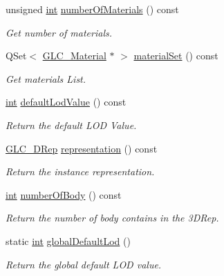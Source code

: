 \begin{DoxyCompactItemize}
unsigned \hyperlink{ioapi_8h_a787fa3cf048117ba7123753c1e74fcd6}{int} \hyperlink{class_g_l_c__3_d_view_instance_ad70b15e7174d9f15e6577bbeb6bd1ed4}{number\-Of\-Materials} () const 
\begin{DoxyCompactList}\small\item\em Get number of materials. \end{DoxyCompactList}\item 
Q\-Set$<$ \hyperlink{class_g_l_c___material}{G\-L\-C\-\_\-\-Material} $\ast$ $>$ \hyperlink{class_g_l_c__3_d_view_instance_a9480322486ef25200cd9da9bf24865ea}{material\-Set} () const 
\begin{DoxyCompactList}\small\item\em Get materials List. \end{DoxyCompactList}\item 
\hyperlink{ioapi_8h_a787fa3cf048117ba7123753c1e74fcd6}{int} \hyperlink{class_g_l_c__3_d_view_instance_a34a76e4f1930c6501b2999910e1cdad7}{default\-Lod\-Value} () const 
\begin{DoxyCompactList}\small\item\em Return the default L\-O\-D Value. \end{DoxyCompactList}\item 
\hyperlink{class_g_l_c__3_d_rep}{G\-L\-C\-\_\-D\-Rep} \hyperlink{class_g_l_c__3_d_view_instance_a1a09befa1df8bf493878feaa22e7a971}{representation} () const 
\begin{DoxyCompactList}\small\item\em Return the instance representation. \end{DoxyCompactList}\item 
\hyperlink{ioapi_8h_a787fa3cf048117ba7123753c1e74fcd6}{int} \hyperlink{class_g_l_c__3_d_view_instance_ad8e2ec4021082d2f83d9631f5b3bd2ed}{number\-Of\-Body} () const 
\begin{DoxyCompactList}\small\item\em Return the number of body contains in the 3\-D\-Rep. \end{DoxyCompactList}\item 
static \hyperlink{ioapi_8h_a787fa3cf048117ba7123753c1e74fcd6}{int} \hyperlink{class_g_l_c__3_d_view_instance_a8dd04cd229aaec519c1df2c133f42728}{global\-Default\-Lod} ()
\begin{DoxyCompactList}\small\item\em Return the global default L\-O\-D value. \end{DoxyCompactList}\end{DoxyCompactItemize}
